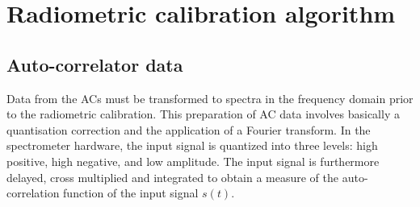 %
%
%
%
%
%




\section{Radiometric calibration algorithm}

\subsection{Auto-correlator data}

Data from the ACs must be transformed to spectra in the frequency domain
prior to the radiometric calibration.
This preparation of AC data involves basically a quantisation correction and the application
of a Fourier transform.
In the spectrometer hardware, the input signal is quantized into three levels: 
high positive, high negative, and low amplitude. The input signal is furthermore delayed, 
cross multiplied and integrated to obtain a measure of the auto-correlation function of the 
input signal \(s(t)\). 

